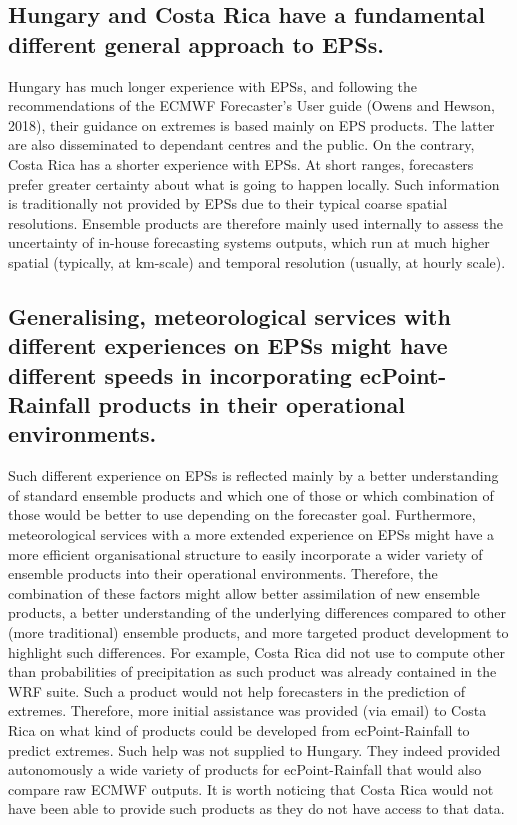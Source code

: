 \documentclass[twocol]{ametsocV5} %
\begin{document}
\subsection{Hungary and Costa Rica have a fundamental different general approach to EPSs.} 
    Hungary has much longer experience with EPSs, and following the recommendations of the ECMWF Forecaster’s User guide (Owens and Hewson, 2018), their guidance on extremes is based mainly on EPS products. The latter are also disseminated to dependant centres and the public. On the contrary, Costa Rica has a shorter experience with EPSs. At short ranges, forecasters prefer greater certainty about what is going to happen locally. Such information is traditionally not provided by EPSs due to their typical coarse spatial resolutions. Ensemble products are therefore mainly used internally to assess the uncertainty of in-house forecasting systems outputs, which run at much higher spatial (typically, at km-scale) and temporal resolution (usually, at hourly scale). 

\subsection{Generalising, meteorological services with different experiences on EPSs might have different speeds in incorporating ecPoint-Rainfall products in their operational environments.}
    Such different experience on EPSs is reflected mainly by a better understanding of standard ensemble products and which one of those or which combination of those would be better to use depending on the forecaster goal. Furthermore, meteorological services with a more extended experience on EPSs might have a more efficient organisational structure to easily incorporate a wider variety of ensemble products into their operational environments. Therefore, the combination of these factors might allow better assimilation of new ensemble products, a better understanding of the underlying differences compared to other (more traditional) ensemble products, and more targeted product development to highlight such differences. For example, Costa Rica did not use to compute other than probabilities of precipitation as such product was already contained in the WRF suite. Such a product would not help forecasters in the prediction of extremes. Therefore, more initial assistance was provided (via email) to Costa Rica on what kind of products could be developed from ecPoint-Rainfall to predict extremes. Such help was not supplied to Hungary. They indeed provided autonomously a wide variety of products for ecPoint-Rainfall that would also compare raw ECMWF outputs. It is worth noticing that Costa Rica would not have been able to provide such products as they do not have access to that data.  
\end{document}
